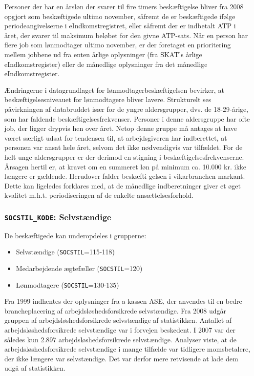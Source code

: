 Personer der har en årsløn der svarer til fire timers beskæftigelse bliver fra 2008 opgjort som beskæftigede ultimo november, såfremt de er beskæftigede ifølge periodeangivelserne i eIndkomstregistret, eller såfremt der er indbetalt ATP i året, der svarer til maksimum beløbet for den givne ATP-sats. Når en person har flere job som lønmodtager ultimo november, er der foretaget en prioritering mellem jobbene ud fra enten årlige oplysninger (fra SKAT's årlige eIndkomstregister) eller de månedlige oplysninger fra det månedlige eIndkomstregister.

Ændringerne i datagrundlaget for lønmodtagerbeskæftigelsen bevirker, at beskæftigelsesniveauet for lønmodtagere bliver lavere. Strukturelt ses påvirkningen af databruddet især for de yngre aldersgrupper, dvs. de 18-29-årige, som har faldende beskæftigelsesfrekvenser. Personer i denne aldersgruppe har ofte job, der ligger drypvis hen over året. Netop denne gruppe må antages at have været særligt udsat for tendensen til, at arbejdsgiveren har indberettet, at personen var ansat hele året, selvom det ikke nødvendigvis var tilfældet. For de helt unge aldersgrupper er der derimod en stigning i beskæftigelsesfrekvenserne. Årsagen hertil er, at kravet om en summeret løn på minimum ca. 10.000 kr. ikke længere er gældende. Herudover falder beskæfti-gelsen i vikarbranchen markant. Dette kan ligeledes forklares med, at de månedlige indberetninger giver et øget kvalitet m.h.t. periodiseringen af de enkelte ansættelsesforhold.


\subsubsection{\texttt{SOCSTIL\_KODE}: Selvstændige \label{}}

De beskæftigede kan underopdeles i grupperne:
\begin{itemize} [topsep=6pt,itemsep=-1ex]
  \item Selvstændige (\texttt{SOCSTIL}=115-118)
  \item Medarbejdende ægtefæller (\texttt{SOCSTIL}=120)
  \item Lønmodtagere (\texttt{SOCSTIL}=130-135)
\end{itemize}

Fra 1999 indhentes der oplysninger fra a-kassen ASE, der anvendes til en bedre brancheplacering af arbejdsløshedsforsikrede selvstændige. Fra 2008 udgår gruppen af arbejdsløshedsforsikrede selvstændige af statistikken. Antallet af arbejdsløshedsforsikrede selvstændige var i forvejen beskedent. I 2007 var der således kun 2.897 arbejdsløshedsforsikrede selvstændige. Analyser viste, at de arbejdsløshedsforsikrede selvstændige i mange tilfælde var tidligere momsbetalere, der ikke længere var selvstændige. Det var derfor mere retvisende at lade dem udgå af statistikken.


